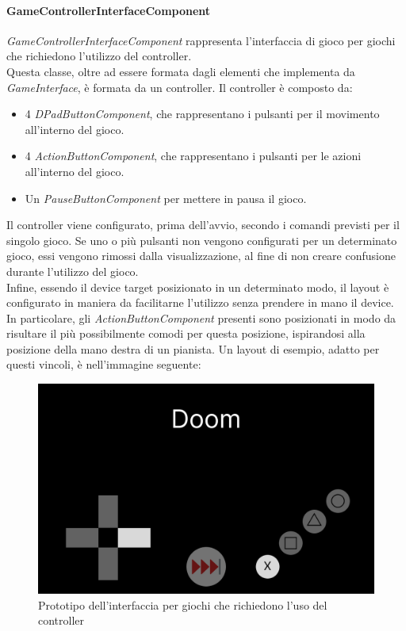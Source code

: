 \paragraph{GameControllerInterfaceComponent}
\emph{GameControllerInterfaceComponent} rappresenta l'interfaccia di gioco per giochi che richiedono l'utilizzo del controller.\\
Questa classe, oltre ad essere formata dagli elementi che implementa da \emph{GameInterface}, è formata da un controller. Il controller è composto da:
\begin{itemize}
    \item 4 \emph{DPadButtonComponent}, che rappresentano i pulsanti per il movimento all'interno del gioco.
    \item 4 \emph{ActionButtonComponent}, che rappresentano i pulsanti per le azioni\\ all'interno del gioco.
    \item Un \emph{PauseButtonComponent} per mettere in pausa il gioco.
\end{itemize}
Il controller viene configurato, prima dell'avvio, secondo i comandi previsti per il singolo gioco. Se uno o più pulsanti non vengono configurati per un determinato gioco, essi vengono rimossi dalla visualizzazione, al fine di non creare confusione durante l'utilizzo del gioco.\\
Infine, essendo il device target posizionato in un determinato modo, il layout è configurato in maniera da facilitarne l'utilizzo senza prendere in mano il device.\\
In particolare, gli \emph{ActionButtonComponent} presenti sono posizionati in modo da risultare il più possibilmente comodi per questa posizione, ispirandosi alla posizione della mano destra di un pianista.
Un layout di esempio, adatto per questi vincoli, è nell'immagine seguente:
\begin{figure}[h]
    \centering
    \includegraphics[width=340pt]{images/prog/ControllerMockup.png}
    \caption{Prototipo dell'interfaccia per giochi che richiedono l'uso del controller}
    \label{fig:controller}
\end{figure}

